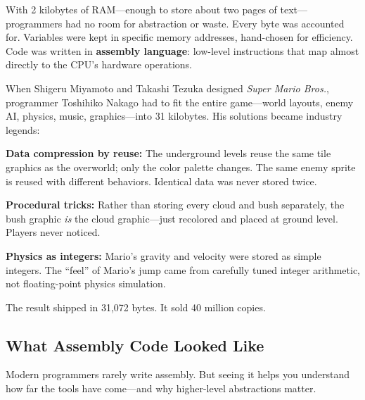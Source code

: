 \documentclass[11pt,letterpaper]{article}
\newcommand{\keyterm}[1]{\textbf{\textcolor{cssecondary}{#1}}}
\begin{document}
With 2 kilobytes of RAM---enough to store about two pages of text---programmers had no room for abstraction or waste. Every byte was accounted for. Variables were kept in specific memory addresses, hand-chosen for efficiency. Code was written in \keyterm{assembly language}: low-level instructions that map almost directly to the CPU's hardware operations.

\begin{historybox}
When Shigeru Miyamoto and Takashi Tezuka designed \textit{Super Mario Bros.}, programmer Toshihiko Nakago had to fit the entire game---world layouts, enemy AI, physics, music, graphics---into 31 kilobytes. His solutions became industry legends:

\textbf{Data compression by reuse:} The underground levels reuse the same tile graphics as the overworld; only the color palette changes. The same enemy sprite is reused with different behaviors. Identical data was never stored twice.

\textbf{Procedural tricks:} Rather than storing every cloud and bush separately, the bush graphic \textit{is} the cloud graphic---just recolored and placed at ground level. Players never noticed.

\textbf{Physics as integers:} Mario's gravity and velocity were stored as simple integers. The ``feel'' of Mario's jump came from carefully tuned integer arithmetic, not floating-point physics simulation.

The result shipped in 31,072 bytes. It sold 40 million copies.
\end{historybox}

\subsection{What Assembly Code Looked Like}

Modern programmers rarely write assembly. But seeing it helps you understand how far the tools have come---and why higher-level abstractions matter.

\end{document}
